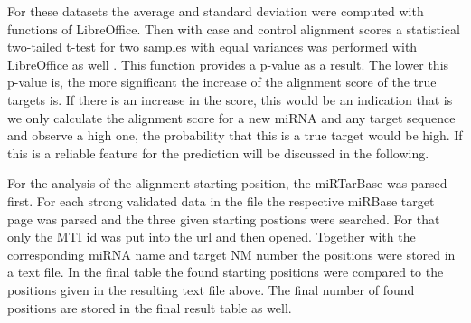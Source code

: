 \documentclass[12pt]{article}
\begin{document}
For these datasets the average and standard deviation were computed with functions of LibreOffice. Then with case and control alignment scores a statistical two-tailed t-test for two samples with equal variances was performed with LibreOffice as well \cite{ttest}. This function provides a p-value as a result. The lower this p-value is, the more significant the increase of the alignment score of the true targets is. If there is an increase in the score, this would be an indication that is we only calculate the alignment score for a new miRNA and any target sequence and observe a high one, the probability that this is a true target would be high. If this is a reliable feature for the prediction will be discussed in the following.

For the analysis of the alignment starting position, the miRTarBase was parsed first. For each strong validated data in the file the respective miRBase target page was parsed and the three given starting postions were searched. For that only the MTI id was put into the url and then opened. Together with the corresponding miRNA name and target NM number the positions were stored in a text file. In the final table the found starting positions were compared to the positions given in the resulting text file above. The final number of found positions are stored in the final result table as well. 



\vspace{1cm}
\end{document}
